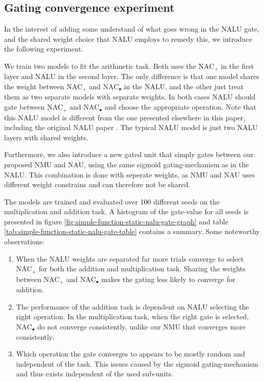 \subsection{Gating convergence experiment}
\label{sec:appendix:nalu-gate-experiment}

In the interest of adding some understand of what goes wrong in the NALU gate, and the shared weight choice that NALU employs to remedy this, we introduce the following experiment.

We train two models to fit the arithmetic task. Both uses the $\mathrm{NAC}_{+}$ in the first layer and NALU in the second layer. The only difference is that one model shares the weight between $\mathrm{NAC}_{+}$ and $\mathrm{NAC}_{\bullet}$ in the NALU, and the other just treat them as two separate models with separate weights. In both cases NALU should gate between $\mathrm{NAC}_{+}$ and $\mathrm{NAC}_{\bullet}$ and choose the appropriate operation. Note that this NALU model is different from the one presented elsewhere in this paper, including the original NALU paper \cite{trask-nalu}. The typical NALU model is just two NALU layers with shared weights.

Furthermore, we also introduce a new gated unit that simply gates between our proposed NMU and NAU, using the same sigmoid gating-mechanism as in the NALU. This combination is done with seperate weights, as NMU and NAU uses different weight constrains and can therefore not be shared.

The models are trained and evaluated over 100 different seeds on the multiplication and addition task. A histogram of the gate-value for all seeds is presented in figure \ref{fig:simple-function-static-nalu-gate-graph} and table \ref{tab:simple-function-static-nalu-gate-table} contains a summary. Some noteworthy observations:

\vspace{-0.3cm}\begin{enumerate}
    \item When the NALU weights are separated far more trials converge to select $\mathrm{NAC}_{+}$ for both the addition and multiplication task. Sharing the weights between $\mathrm{NAC}_{+}$ and $\mathrm{NAC}_{\bullet}$ makes the gating less likely to converge for addition.
    \item The performance of the addition task is dependent on NALU selecting the right operation. In the multiplication task, when the right gate is selected, $\mathrm{NAC}_{\bullet}$ do not converge consistently, unlike our NMU that converges more consistently.
    \item Which operation the gate converges to appears to be mostly random and independent of the task. This issues caused by the sigmoid gating-mechanism and thus exists independent of the used sub-units.
\end{enumerate}


